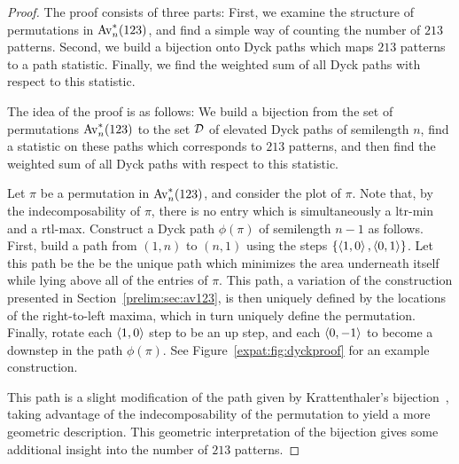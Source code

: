     \begin{proof}
      The proof consists of three parts: First, we examine the structure of
      permutations in $\operatorname{{Av}}_n^*(123)$, and find a simple way of counting the number of
      $213$ patterns. Second, we build a bijection onto Dyck paths which maps
      $213$ patterns to a path statistic. Finally, we find the weighted sum of
      all Dyck paths with respect to this statistic.

      The idea of the proof is as follows: We build a bijection from the set of
      permutations $\operatorname{{Av}}_n^*(123)$ to the set $\mathcal{D}$ of elevated Dyck paths of semilength
      $n$, find a statistic on these paths which corresponds to $213$ patterns,
      and then find the weighted sum of all Dyck paths with respect to this
      statistic.

      Let $\pi$ be a permutation in $\operatorname{{Av}}_n^*(123)$, and consider the plot of $\pi$.
      Note that, by the indecomposability of $\pi$, there is no entry which is
      simultaneously a ltr-min and a rtl-max. Construct a Dyck path $\phi(\pi)$
      of semilength $n-1$ as follows. First, build a path from $(1,n)$ to
      $(n,1)$ using the steps $\{\left\langle 1,0 \right\rangle, \left\langle 0,1 \right\rangle \}$. Let this path be
      the be the unique path which minimizes the area underneath itself while
      lying above all of the entries of $\pi$. This path, a variation of the
      construction presented in Section~\ref{prelim:sec:av123}, is then
      uniquely defined by the locations of the right-to-left maxima, which in
      turn uniquely define the permutation. Finally, rotate each $\left\langle 1,0 \right\rangle$
      step to be an up step, and each $\left\langle 0,-1 \right\rangle$ to become a downstep in
      the path $\phi(\pi)$. See Figure~\ref{expat:fig:dyckproof} for an example
      construction. 
      
      This path is a slight modification of the path given by Krattenthaler's
      bijection~\cite{Krattenthaler2001}, taking advantage of the
      indecomposability of the permutation to yield a more geometric description.
      This geometric interpretation of the bijection gives some additional
      insight into the number of $213$ patterns. 


\end{proof}
